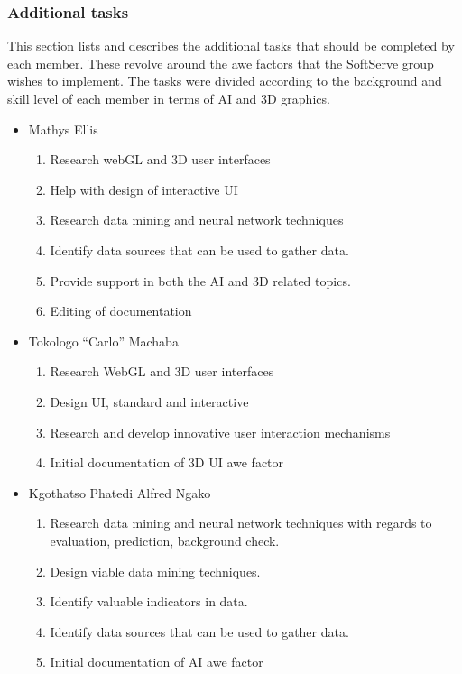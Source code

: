 \documentclass[12pt]{article}
\begin{document}
\subsubsection{Additional tasks}
This section lists and describes the additional tasks that should be completed by each member. These revolve around the awe factors that the SoftServe group wishes to implement. The tasks were divided according to the background and skill level of each member in terms of AI and 3D graphics. 
\begin{itemize}
	\item Mathys Ellis
	\begin{enumerate}
		\item Research webGL and 3D user interfaces
		\item Help with design of interactive UI
		\item Research data mining and neural network techniques
		\item Identify data sources that can be used to gather data.
		\item Provide support in both the AI and 3D related topics.
		\item Editing of documentation
	\end{enumerate}
	\item Tokologo “Carlo” Machaba
	\begin{enumerate}
		\item Research WebGL and 3D user interfaces
		\item Design UI, standard and interactive
		\item Research and develop innovative user interaction mechanisms
		\item Initial documentation of 3D UI awe factor
	\end{enumerate}
	\item Kgothatso Phatedi Alfred Ngako
	\begin{enumerate}
		\item Research data mining and neural network techniques with regards to evaluation, prediction, background check.
		\item Design viable data mining techniques.
		\item Identify valuable indicators in data.
		\item Identify data sources that can be used to gather data.
		\item Initial documentation of AI awe factor
	\end{enumerate}
\end{itemize}
\end{document}
